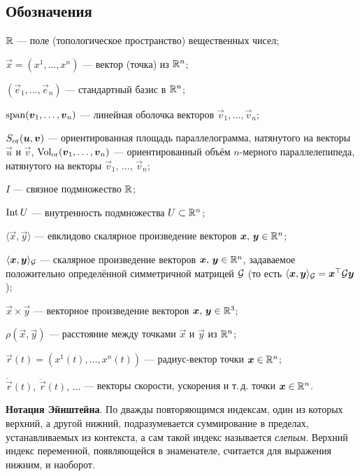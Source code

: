 \subsection*{Обозначения}

\begin{center}
\begin{minipage}{.9\textwidth}
	$\mathbb{R}$ --- поле (топологическое пространство) вещественных чисел;

	$\vec{x} = (x^1, \ldots, x^n)$ --- вектор (точка) из $\mathbb{R}^n$;
	
	$(\vec{e}_1, \ldots, \vec{e}_n)$ --- стандартный базис в $\mathbb{R}^n$;

	$\operatorname{span}(\boldsymbol{v}_1, \ldots, \boldsymbol{v}_n)$ --- линейная оболочка векторов $\vec{v}_1, \ldots, \vec{v}_n$;

	$S_{\mathrm{or}}(\boldsymbol{u}, \boldsymbol{v})$ --- ориентированная площадь параллелограмма, натянутого на векторы $\vec{u}$ и $\vec{v}$, $\operatorname{Vol}_{\mathrm{or}}(\boldsymbol{v}_1, \ldots, \boldsymbol{v}_n)$ --- ориентированный объём $n$-мерного параллелепипеда, натянутого на векторы $\vec{v}_1,\,\ldots,\,\vec{v}_n$;

	$I$ --- связное подмножество $\mathbb{R}$;

	$\operatorname{Int} U$ --- внутренность подмножества $U \subset \mathbb{R}^n$;

	$\langle\vec{x}, \vec{y}\rangle$ --- евклидово скалярное произведение векторов $\boldsymbol{x},\,\boldsymbol{y} \in \mathbb{R}^n$;

	$\langle\boldsymbol{x}, \boldsymbol{y}\rangle_{\mathcal{G}}$ --- скалярное произведение векторов $\boldsymbol{x},\,\boldsymbol{y} \in \mathbb{R}^n$, задаваемое положительно определённой симметричной матрицей $\mathcal{G}$ (то есть $\langle\boldsymbol{x}, \boldsymbol{y}\rangle_{\mathcal{G}} = \boldsymbol{x}^\top\mathcal{G}\boldsymbol{y}$);

	$\vec{x} \times \vec{y}$ --- векторное произведение векторов $\boldsymbol{x},\,\boldsymbol{y} \in \mathbb{R}^3$;

	$\rho(\vec{x}, \vec{y})$ --- расстояние между точками $\vec{x}$ и $\vec{y}$ из $\mathbb{R}^n$;

	$\vec{r}(t) = (x^1(t), \ldots, x^n(t))$ --- радиус-вектор точки $\boldsymbol{x} \in \mathbb{R}^n$;

	$\dot{\vec{r}}(t),\,\ddot{\vec{r}}(t),\,\ldots$ --- векторы скорости, ускорения и т.\,д. точки $\boldsymbol{x} \in \mathbb{R}^n$.

	\medskip
	\textbf{Нотация Эйнштейна}. {\small По дважды повторяющимся индексам, один из которых верхний, а другой нижний, подразумевается суммирование в пределах, устанавливаемых из контекста, а сам такой индекс называется \textit{слепым}. Верхний индекс переменной, появляющейся в знаменателе, считается для выражения нижним, и наоборот.}
\end{minipage}
\end{center}

